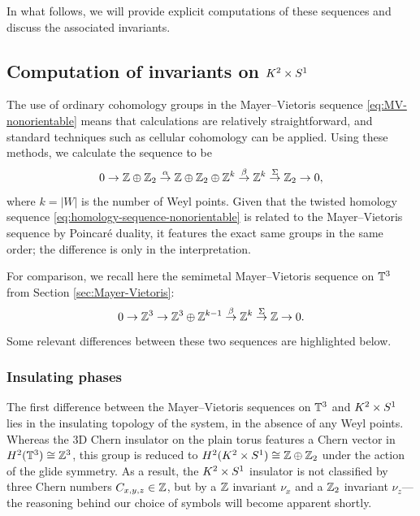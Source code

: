 In what follows, we will provide explicit computations of these sequences and discuss the associated invariants.


\subsection{Computation of invariants on \texorpdfstring{$K^2\times S^1$}{K²×S¹}}

The use of ordinary cohomology groups in the Mayer--Vietoris sequence \eqref{eq:MV-nonorientable} means that calculations are relatively straightforward, and standard techniques such as cellular cohomology can be applied.  %
Using these methods, we calculate the sequence to be
\begin{equation}\label{eq:explicit-sequence-nonorientable}
	0\to \mathbb{Z}\oplus\mathbb{Z}_2 \overset{\alpha}{\to} \mathbb{Z}\oplus\mathbb{Z}_2\oplus\mathbb{Z}^k \overset{\beta}{\to} \mathbb{Z}^k \overset{\Sigma}{\to} \mathbb{Z}_2 \to 0,
\end{equation}
where $k = |W|$ is the number of Weyl points. Given that the twisted homology sequence \eqref{eq:homology-sequence-nonorientable} is related to the Mayer--Vietoris sequence by Poincaré duality, it features the exact same groups in the same order; the difference is only in the interpretation. 

For comparison, we recall here the semimetal Mayer--Vietoris sequence on $\mathbb{T}^3$ from Section \ref{sec:Mayer-Vietoris}:
\begin{equation}\label{eq:semimetal-MV-explicit-again}
	0 \to \mathbb{Z}^3 \to \mathbb{Z}^3\oplus\mathbb{Z}^{k-1} \overset{\beta}{\to} \mathbb{Z}^k \overset{\Sigma}{\to} \mathbb{Z} \to 0.
\end{equation}
Some relevant differences between these two sequences are highlighted below.

\subsubsection{Insulating phases}

The first difference between the Mayer--Vietoris sequences on $\mathbb{T}^3$ and $K^2\times S^1$ lies in the insulating topology of the system, in the absence of any Weyl points. Whereas the 3D Chern insulator on the plain torus features a Chern vector in $H^2(\mathbb{T}^3)\cong\mathbb{Z}^3$, this group is reduced to $H^2(K^2\times S^1)\cong\mathbb{Z}\oplus\mathbb{Z}_2$ under the action of the glide symmetry. As a result, the $K^2\times S^1$ insulator is not classified by three Chern numbers $C_{x,y,z}\in\mathbb{Z}$, but by a $\mathbb{Z}$ invariant $\nu_x$ and a $\mathbb{Z}_2$ invariant $\nu_z$---the reasoning behind our choice of symbols will become apparent shortly.

